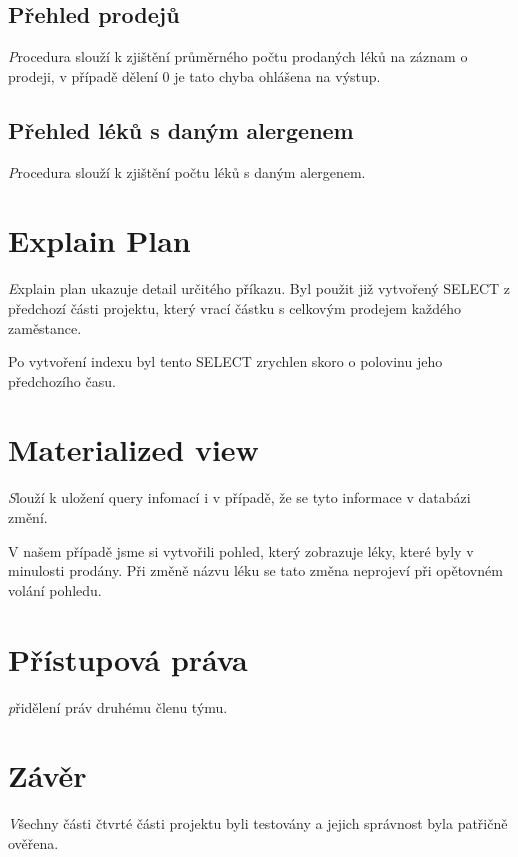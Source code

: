 \documentclass[10pt,a4paper]{article}
\begin{document}
        \subsection{Přehled prodejů}
            \textit Procedura slouží k zjištění průměrného počtu prodaných léků na záznam o prodeji, v případě dělení 0 je tato chyba ohlášena na výstup.
            
         \subsection{Přehled léků s daným alergenem}
            \textit Procedura slouží k zjištění počtu léků s daným alergenem.
            
    \section{Explain Plan}
        \textit Explain plan ukazuje detail určitého příkazu. Byl použit již vytvořený SELECT z předchozí části projektu, který vrací částku s celkovým prodejem každého zaměstance.
        
        Po vytvoření indexu byl tento SELECT zrychlen skoro o polovinu jeho předchozího času.
        
    \section{Materialized view}
        \textit Slouží k uložení query infomací i v případě, že se tyto informace v databázi změní.
        
        V našem případě jsme si vytvořili pohled, který zobrazuje léky, které byly v minulosti prodány. Při změně názvu léku se tato změna neprojeví při opětovném volání pohledu.
        
    \section{Přístupová práva}
        \textit přidělení práv druhému členu týmu.
        
    \newpage
    \section{Závěr}
     \textit Všechny části čtvrté části projektu byli testovány a jejich správnost byla patřičně ověřena.
    
\end{document}
